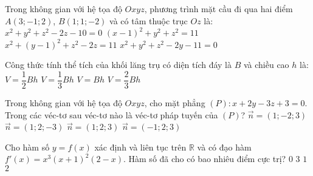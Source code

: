 \begin{ex}%
Trong  không  gian  với  hệ  tọa  độ  $Oxyz$,  phương  trình  mặt  cầu  đi  qua  hai  điểm $A(3;-1;2)$, $B(1;1;-2)$ và có tâm thuộc trục $Oz$  là:
	\choice
	{\True $x^2+y^2+z^2-2z-10=0$}
	{$(x-1)^2+y^2+z^2=11$}
	{$x^2+(y-1)^2+z^2-2z=11$ }
	{$x^2+y^2+z^2-2y-11=0$}
\end{ex}
\begin{ex}%
	Công thức tính thể tích của khối lăng trụ có diện tích đáy là $B$ và chiều cao $h$ là: 
	\choice
	{ $V=\dfrac{1}{2}Bh$}
	{\True $V=\dfrac{1}{3}Bh$}
	{$V=Bh$ }
	{$V=\dfrac{2}{3}Bh$}
	\loigiai{
		
	}
\end{ex}
\begin{ex}%
	Trong  không  gian  với  hệ  tọa  độ  $Oxyz$, cho mặt phẳng $(P): x+2y-3z+3=0$. Trong các véc-tơ sau véc-tơ nào là véc-tơ pháp tuyến của $(P)$? 
	\choice
	{ $\vec n=(1;-2;3)$}
	{\True $\vec n=(1;2;-3)$}
	{$\vec n =(1;2;3)$ }
	{$\vec n= (-1;2;3)$}
	\loigiai{
		
	}
\end{ex}
\begin{ex}%
	Cho hàm số $y=f(x)$ xác định và liên tục trên $\mathbb{R}$ và có đạo hàm $f'(x)=x^3(x+1)^2(2-x)$. Hàm số đã cho có bao nhiêu điểm cực trị? 
		\choice
	{ $0$}
	{ $3$}
	{$1$ }
	{\True $2$}
\end{ex}
